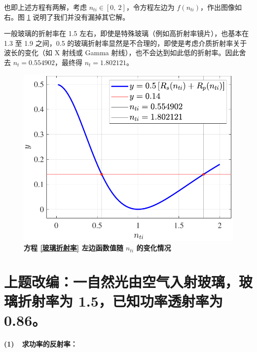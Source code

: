 \documentclass[UTF8]{report}
\theoremstyle{MyLineTheoremStyle} %
\theoremstyle{MyBlockTheoremStyle} %
\theoremstyle{MySubsubsectionStyle} %
\begin{document}
\begin{center}\noindent\begin{minipage}{0.50\textwidth}
\hspace*{2em} 也即上述方程有两解，考虑 $n_{ti} \in [0,\ 2]$，令方程左边为 $f(n_{ti})$，作出图像如右。图 \ref{方程左边的变化情况} 说明了我们并没有漏掉其它解。

\hspace*{2em} 一般玻璃的折射率在 1.5 左右，即使是特殊玻璃（例如高折射率镜片），也基本在 1.3 至 1.9 之间，0.5 的玻璃折射率显然是不合理的，即使是考虑介质折射率关于波长的变化（如 X 射线或 Gamma 射线），也不会达到如此低的折射率。因此舍去 $n_t = 0.554902$，最终得 $n_t = 1.802121$。
\end{minipage}\hfill\begin{minipage}{0.43\textwidth}
    \begin{figure}[H]\centering
        \includegraphics[width=\textwidth]{assets/2/2024-09-18_01-08-40.pdf}
        \vspace*{-9mm}
        \caption{\bfseries 方程 \ref{玻璃折射率} 左边函数值随 $n_{ti}$ 的变化情况}\label{方程左边的变化情况}
        \end{figure}
\end{minipage}\end{center}





\section{上题改编：一自然光由空气入射玻璃，玻璃折射率为 1.5，已知功率透射率为 0.86。}
\textbf{(1)\ \ 求功率的反射率：}
\end{document}
